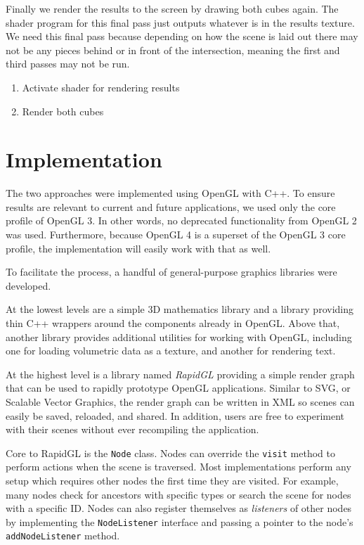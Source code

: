 \documentclass{report}
\begin{document}
Finally we render the results to the screen by drawing both cubes again.  The
shader program for this final pass just outputs whatever is in the results
texture.  We need this final pass because depending on how the scene is laid out
there may not be any pieces behind or in front of the intersection, meaning the
first and third passes may not be run.

\begin{enumerate}
  \item Activate shader for rendering results
  \item Render both cubes
\end{enumerate}

\chapter{Implementation}

The two approaches were implemented using OpenGL with C++.  To ensure results
are relevant to current and future applications, we used only the core profile
of OpenGL 3.  In other words, no deprecated functionality from OpenGL 2 was
used.  Furthermore, because OpenGL 4 is a superset of the OpenGL 3 core profile,
the implementation will easily work with that as well.

To facilitate the process, a handful of general-purpose graphics libraries were
developed.

At the lowest levels are a simple 3D mathematics library and a library providing
thin C++ wrappers around the components already in OpenGL.  Above that, another
library provides additional utilities for working with OpenGL, including one for
loading volumetric data as a texture, and another for rendering text.

At the highest level is a library named {\em RapidGL} providing a simple render
graph that can be used to rapidly prototype OpenGL applications.  Similar to
SVG, or Scalable Vector Graphics, the render graph can be written in XML so
scenes can easily be saved, reloaded, and shared.  In addition, users are free
to experiment with their scenes without ever recompiling the application.

Core to RapidGL is the {\tt Node} class.  Nodes can override the {\tt visit}
method to perform actions when the scene is traversed.  Most implementations
perform any setup which requires other nodes the first time they are visited.
For example, many nodes check for ancestors with specific types or search the
scene for nodes with a specific ID.  Nodes can also register themselves as {\em
listeners} of other nodes by implementing the {\tt NodeListener} interface and
passing a pointer to the node's {\tt addNodeListener} method.
\end{document}
